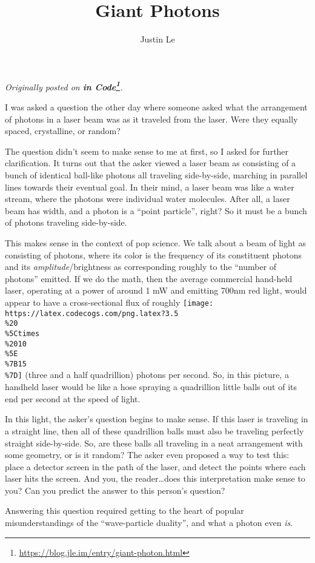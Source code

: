 \documentclass[]{article}
\title{Giant Photons}
\author{Justin Le}
\renewcommand{\href}[2]{#2\footnote{\url{#1}}}
\begin{document}
\maketitle

\emph{Originally posted on
\textbf{\href{https://blog.jle.im/entry/giant-photon.html}{in Code}}.}

I was asked a question the other day where someone asked what the arrangement of
photons in a laser beam was as it traveled from the laser. Were they equally
spaced, crystalline, or random?

The question didn't seem to make sense to me at first, so I asked for further
clarification. It turns out that the asker viewed a laser beam as consisting of
a bunch of identical ball-like photons all traveling side-by-side, marching in
parallel lines towards their eventual goal. In their mind, a laser beam was like
a water stream, where the photons were individual water molecules. After all, a
laser beam has width, and a photon is a ``point particle'', right? So it must be
a bunch of photons traveling side-by-side.

This makes sense in the context of pop science. We talk about a beam of light as
consisting of photons, where its color is the frequency of its constituent
photons and its \emph{amplitude}/brightness as corresponding roughly to the
``number of photons'' emitted. If we do the math, then the average commercial
hand-held laser, operating at a power of around 1 mW and emitting 700nm red
light, would appear to have a cross-sectional flux of roughly
\texttt{[image: https://latex.codecogs.com/png.latex?3.5\\\%20\\\%5Ctimes\\\%2010\\\%5E\\\%7B15\\\%7D]}
(three and a half quadrillion) photons per second. So, in this picture, a
handheld laser would be like a hose spraying a quadrillion little balls out of
its end per second at the speed of light.

In this light, the asker's question begins to make sense. If this laser is
traveling in a straight line, then all of these quadrillion balls must also be
traveling perfectly straight side-by-side. So, are these balls all traveling in
a neat arrangement with some geometry, or is it random? The asker even proposed
a way to test this: place a detector screen in the path of the laser, and detect
the points where each laser hits the screen. And you, the reader\ldots does this
interpretation make sense to you? Can you predict the answer to this person's
question?

Answering this question required getting to the heart of popular
misunderstandings of the ``wave-particle duality'', and what a photon even
\emph{is}.
\end{document}
